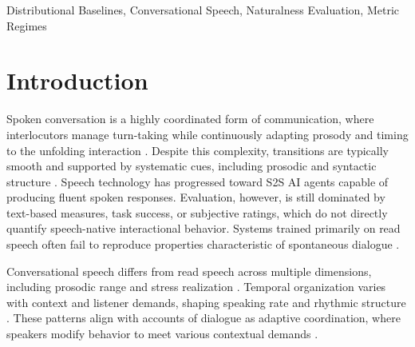 \documentclass[conference]{IEEEtran}
\begin{document}
\maketitle

\begin{abstract}
Speech-to-speech (S2S) AI agents are advancing rapidly, yet evaluation remains dominated by text-centric measures, task success, or subjective ratings that do not directly capture conversational naturalness. 
We analyze 4000+ hours of dyadic English conversation from the Seamless Interaction dataset to derive speech-native reference distributions. 
We compute prosodic (Mean, Range, \& Standard Deviation of F0) and temporal (Speech \& Articulation Rate, Pause Ratio) operating regimes and quantify how they shift with speaker (gender and age) and interaction (arousal and dominance) factors.
These empirically grounded regimes provide calibrated targets for speech-native, multi-cue evaluation of interaction quality, intending to support future approaches that combine multiple cues to detect and characterize unnatural speech in S2S dialogue model outputs.
\end{abstract}

\begin{IEEEkeywords}
Distributional Baselines, Conversational Speech, Naturalness Evaluation, Metric Regimes
\end{IEEEkeywords}

\section{Introduction}

Spoken conversation is a highly coordinated form of communication, where interlocutors manage turn-taking while continuously adapting prosody and timing to the unfolding interaction \cite{riest_anticipation_2015, levinson_turn-taking_2016}. 
Despite this complexity, transitions are typically smooth and supported by systematic cues, including prosodic and syntactic structure \cite{koiso_analysis_1998}.
Speech technology has progressed toward S2S AI agents capable of producing fluent spoken responses. 
Evaluation, however, is still dominated by text-based measures, task success, or subjective ratings, which do not directly quantify speech-native interactional behavior. 
Systems trained primarily on read speech often fail to reproduce properties characteristic of spontaneous dialogue \cite{omahony_combining_2022}.

Conversational speech differs from read speech across multiple dimensions, including prosodic range and stress realization \cite{howell1991comparison, hazan2010does}. 
Temporal organization varies with context and listener demands, shaping speaking rate and rhythmic structure \cite{tauroza_speech_1990, ward_automatic_2004, dowding_user_2024, xie_speaking_2024}. 
These patterns align with accounts of dialogue as adaptive coordination, where speakers modify behavior to meet various contextual demands \cite{fusaroli_dialog_2014, wynn_conversational_2024}.
\end{document}
